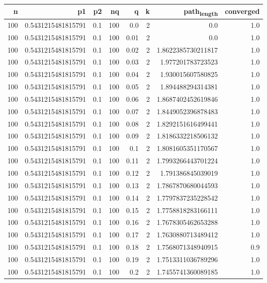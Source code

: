 \documentclass[11pt]{article}
\begin{document}
\begin{center}
\begin{tabular}{rrrrrrrr}
\hline
n & p1 & p2 & nq & q & k & path\textsubscript{length} & converged\\
\hline
100 & 0.5431215481815791 & 0.1 & 100 & 0.0 & 2 & 0.0 & 1.0\\
100 & 0.5431215481815791 & 0.1 & 100 & 0.01 & 2 & 0.0 & 1.0\\
100 & 0.5431215481815791 & 0.1 & 100 & 0.02 & 2 & 1.8622385730211817 & 1.0\\
100 & 0.5431215481815791 & 0.1 & 100 & 0.03 & 2 & 1.977201783723523 & 1.0\\
100 & 0.5431215481815791 & 0.1 & 100 & 0.04 & 2 & 1.930015607580825 & 1.0\\
100 & 0.5431215481815791 & 0.1 & 100 & 0.05 & 2 & 1.894488294314381 & 1.0\\
100 & 0.5431215481815791 & 0.1 & 100 & 0.06 & 2 & 1.8687402452619846 & 1.0\\
100 & 0.5431215481815791 & 0.1 & 100 & 0.07 & 2 & 1.8449052396878483 & 1.0\\
100 & 0.5431215481815791 & 0.1 & 100 & 0.08 & 2 & 1.8292151616499441 & 1.0\\
100 & 0.5431215481815791 & 0.1 & 100 & 0.09 & 2 & 1.8186332218506132 & 1.0\\
100 & 0.5431215481815791 & 0.1 & 100 & 0.1 & 2 & 1.8081605351170567 & 1.0\\
100 & 0.5431215481815791 & 0.1 & 100 & 0.11 & 2 & 1.7993266443701224 & 1.0\\
100 & 0.5431215481815791 & 0.1 & 100 & 0.12 & 2 & 1.791386845039019 & 1.0\\
100 & 0.5431215481815791 & 0.1 & 100 & 0.13 & 2 & 1.7867870680044593 & 1.0\\
100 & 0.5431215481815791 & 0.1 & 100 & 0.14 & 2 & 1.7797837235228542 & 1.0\\
100 & 0.5431215481815791 & 0.1 & 100 & 0.15 & 2 & 1.7758818283166111 & 1.0\\
100 & 0.5431215481815791 & 0.1 & 100 & 0.16 & 2 & 1.7678305462653288 & 1.0\\
100 & 0.5431215481815791 & 0.1 & 100 & 0.17 & 2 & 1.7630880713489412 & 1.0\\
100 & 0.5431215481815791 & 0.1 & 100 & 0.18 & 2 & 1.7568071348940915 & 0.9\\
100 & 0.5431215481815791 & 0.1 & 100 & 0.19 & 2 & 1.7513311036789296 & 1.0\\
100 & 0.5431215481815791 & 0.1 & 100 & 0.2 & 2 & 1.7455741360089185 & 1.0\\

\end{tabular}
\end{center}
\end{document}
